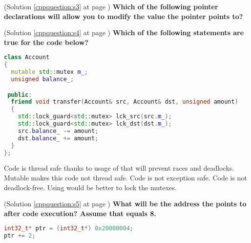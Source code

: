 \begin{cppquestion}
    \label{cppquestion:q3}
    (Solution \ref{cppquestion:s3} at page \pageref{cppquestion:s3})
    \question \textbf{Which of the following pointer declarations will allow you to modify the value the pointer points to?} 
    
    \begin{choices}
     \choice {}
     \choice {}
     \choice {}
     \choice {}
     \choice {}
     \choice {}
    \end{choices}
\end{cppquestion}

\begin{cppquestion}
    \label{cppquestion:q4}
    (Solution \ref{cppquestion:s4} at page \pageref{cppquestion:s4})
    \question \textbf{Which of the following statements are true for the code below?} 
    \begin{lstlisting}[language=c++,numbers=none, caption={}]
class Account
{
  mutable std::mutex m_;
  unsigned balance_;

 public:
  friend void transfer(Account& src, Account& dst, unsigned amount)
  {
    std::lock_guard<std::mutex> lck_src(src.m_);
    std::lock_guard<std::mutex> lck_dst(dst.m_);
    src.balance_ -= amount;
    dst.balance_ += amount;
  }
};
    \end{lstlisting} 

    \begin{choices}
     \choice Code is thread safe thanks to usage of  that will prevent races and deadlocks.
     \choice Mutable  makes this code not thread safe.
     \choice Code is not exception safe.
     \choice Code is not deadlock-free.
     \choice Using  would be better to lock the mutexes.
    \end{choices}
\end{cppquestion}
 

\begin{cppquestion}
    \label{cppquestion:q5}
    (Solution \ref{cppquestion:s5} at page \pageref{cppquestion:s5})
    \question \textbf{What will be the address the  points to after code execution? Assume that  equals 8.} 
\begin{lstlisting}[language=c++,numbers=none, caption={}]
int32_t* ptr = (int32_t*) 0x20000004;
ptr += 2;
\end{lstlisting} 
    \begin{choices}
     \choice {}
     \choice {}
     \choice {}
     \choice {}
     \choice {}
     \choice {}
     \choice {}
    \end{choices}
\end{cppquestion}


